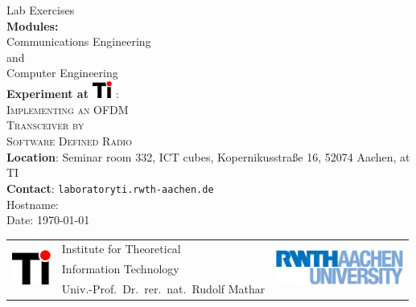 \begin{titlepage}
{
\centering
{\Huge Lab Exercises}\\[15mm]
{\Large \textbf{Modules:}}\\[3mm]
{\Large Communications Engineering}\\[1mm]
{\Large and}\\[1mm] 
{\Large Computer Engineering}\\[20mm]
{\huge \textbf{Experiment at \includegraphics[height=16pt]{ti_veclogo}} :}\\[5mm]
{\huge \textsc{Implementing an OFDM}}\\[2mm]
{\huge \textsc{Transceiver by}}\\[2mm]
{\huge \textsc{Software Defined Radio}}\\[8mm]

{\textbf{Location}: Seminar room 332, ICT cubes, Kopernikusstra{\ss}e 16, 52074 Aachen, at TI}\\[2mm]
{\textbf{Contact}: \texttt{laboratory\MVAt ti.rwth-aachen.de}}\\[30mm]

{\Large Hostname: \textbf{} }\\[6mm]
{\Large Date: \ddmmyyyydate \today}\\[30mm]
}

\begin{tabular}{@{}lll@{}}
\multirow{3}{37pt}{\includegraphics[height=32.3pt]{ti_veclogo}} & Institute for Theoretical & \multirow{3}{37pt}{\hspace*{-4cm}\includegraphics[height=32.3pt]{RWTHAachenUniversity}}\\
& Information Technology&\\
& Univ.-Prof.~Dr.~rer.~nat.~Rudolf Mathar\phantom{blablablablablablablabl}&
\end{tabular}
\end{titlepage}
\newpage

